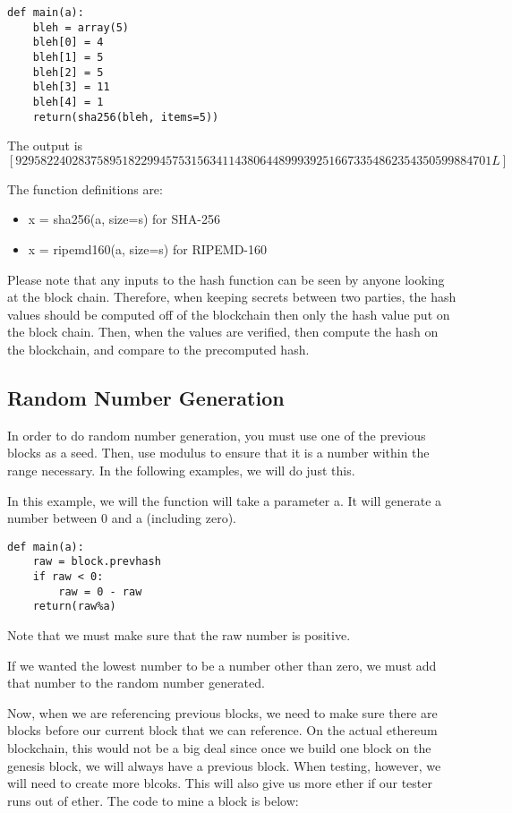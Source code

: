 \documentclass[12pt]{article}
\begin{document}
\begin{lstlisting}
def main(a):
	bleh = array(5)
	bleh[0] = 4
	bleh[1] = 5
	bleh[2] = 5
	bleh[3] = 11
	bleh[4] = 1
	return(sha256(bleh, items=5))
\end{lstlisting}
The output is $[9295822402837589518229945753156341143806448999392516673354862354350599884701L]$

The function definitions are:
\begin{itemize}
	\item x = sha256(a, size=s) for SHA-256
	\item x = ripemd160(a, size=s) for RIPEMD-160
\end{itemize}

Please note that any inputs to the hash function can be seen by anyone looking at the block chain. Therefore, when keeping secrets between two parties, the hash values should be computed off of the blockchain then only the hash value put on the block chain. Then, when the values are verified, then compute the hash on the blockchain, and compare to the precomputed hash.

\subsection{Random Number Generation}
In order to do random number generation, you must use one of the previous blocks as a seed. Then, use modulus to ensure that it is a number within the range necessary. In the following examples, we will do just this.

In this example, we will the function will take a parameter a. It will generate a number between 0 and a (including zero).

\begin{lstlisting}
def main(a):
	raw = block.prevhash
	if raw < 0:
		raw = 0 - raw
	return(raw%a)
\end{lstlisting}

Note that we must make sure that the raw number is positive. \cite{PeterBorah 2014}

If we wanted the lowest number to be a number other than zero, we must add that number to the random number generated. 

Now, when we are referencing previous blocks, we need to make sure there are blocks before our current block that we can reference. On the actual ethereum blockchain, this would not be a big deal since once we build one block on the genesis block, we will always have a previous block. When testing, however, we will need to create more blcoks. This will also give us more ether if our tester runs out of ether. The code to mine a block is below:
\end{document}

